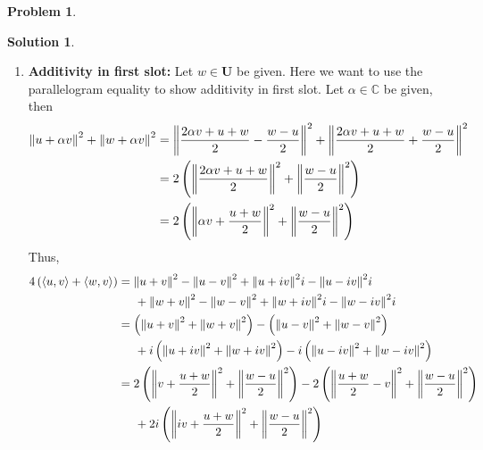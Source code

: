 \documentclass{book}
\theoremstyle{definition}
\newtheorem*{prob*}{Problem}
\newtheorem*{sln*}{Solution}
\newcommand{\U}{\mathbf{U}}
\newcommand{\la}{\langle}
\newcommand{\ra}{\rangle}
\begin{document}
\begin{prob*}
\begin{enumerate}
\begin{sln*}
\begin{enumerate}
				\item \textbf{Additivity in first slot:} Let $w\in \U$ be given. Here we want to use the parallelogram equality to show additivity in first slot. Let $\alpha \in \mathbb{C}$ be given, then
				\begin{align*}
				\norm{u + \alpha v}^2 + \norm{w + \alpha v}^2 &= \norm{\frac{2\alpha v+u+w}{2} - \frac{w-u}{2}}^2 + \norm{\frac{2\alpha v+u+w}{2} + \frac{w-u}{2}}^2 \\
				&= 2 \left( \norm{\frac{2\alpha v+ u + w}{2}}^2 + \norm{\frac{w-u}{2}}^2  \right)\\
				&= 2 \left( \norm{\alpha v  + \frac{u + w}{2}}^2 + \norm{\frac{w-u}{2}}^2  \right)\\
				\end{align*}
				Thus, 
				\begin{align*}
				4\left(\la u,v \ra + \la w,v \ra\right) 
				&= \norm{u+ v}^2  - \norm{u-v}^2 + \norm{u + iv}^2i - \norm{u - iv}^2i \\
				&\hspace{0.5cm}+ \norm{w+ v}^2  - \norm{w-v}^2 + \norm{w + iv}^2i - \norm{w - iv}^2i\\
				&=  \left(\norm{u+ v}^2 + \norm{w+ v}^2\right) - \left(\norm{u-v}^2 + \norm{w-v}^2 \right) \\ 
				&\hspace{0.5cm}+ i \left( \norm{u + iv}^2  + \norm{w + iv}^2 \right) - i\left(\norm{u - iv}^2 + \norm{w - iv}^2 \right) \\
				&= 2\left( \norm{ v + \frac{ u + w}{2}}^2 + \norm{\frac{w - u}{2}}^2 \right) 
				- 2\left( \norm{ \frac{u + w}{2} - v}^2 + \norm{\frac{w - u}{2}}^2 \right) \\
				&\hspace{0.5cm} + 2i\left( \norm{ iv + \frac{u + w}{2}}^2 + \norm{\frac{w - u}{2}}^2 \right)

\end{align*}
\end{enumerate}
\end{sln*}
\end{enumerate}
\end{prob*}
\end{document}
